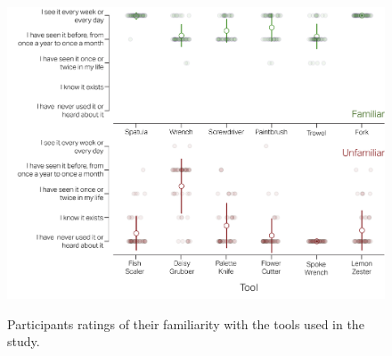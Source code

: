\begin{figure}[H]
    \centering
    \includegraphics[width=0.7\linewidth]{source/figures/result/familiarity_rating.png} \\
    \caption[]{Participants ratings of their familiarity with the tools used in the study.}
    \label{figure:familiarity_rating}
\end{figure}